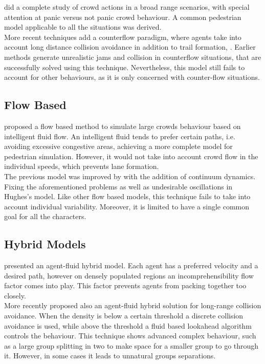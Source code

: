 \documentclass[6pt]{article} %
\begin{document}
\begin{multicols}{2}
\cite{helbing2002} did a complete study of crowd actions in a broad range scenarios, with special attention at panic versus not panic crowd behaviour.
A common pedestrian model applicable to all the situations was derived.\\

More recent techniques add a counterflow paradigm, where agents take into account long distance collision avoidance in addition to trail formation, \cite{heliovaara2012}.
Earlier methods generate unrealistic jams and collision in counterflow situations, that are successfully solved using this technique.
Nevertheless, this model still fails to account for other behaviours, as it is only concerned with counter-flow situations.

\subsection{Flow Based}

\cite{hughes2003} proposed a flow based method to simulate large crowds behaviour based on intelligent fluid flow.
An intelligent fluid tends to prefer certain paths, i.e. avoiding excessive congestive areas, achieving a more complete model for pedestrian simulation.
However, it would not take into account crowd flow in the individual speeds, which prevents lane formation.\\

The previous model was improved by \cite{treuille2006} with the addition of continuum dynamics.
Fixing the aforementioned problems as well as undesirable oscillations in Hughes's model.
Like other flow based models, this technique fails to take into account individual variability.
Moreover, it is limited to have a single common goal for all the characters.

\subsection{Hybrid Models}

\cite{Narain2009} presented an agent-fluid hybrid model.
Each agent has a preferred velocity and a desired path, however on densely populated regions an incomprehensibility flow factor comes into play.
This factor prevents agents from packing together too closely.\\

More recently \cite{lin2014} proposed also an agent-fluid hybrid solution for long-range collision avoidance.
When the density is below a certain threshold a discrete collision avoidance is used,
while above the threshold a fluid based lookahead algorithm controls the behaviour.
This technique shows advanced complex behaviour, such as a large group splitting in two to make space for a smaller group to go through it.
However, in some cases it leads to unnatural groups separations.


\end{multicols}
\end{document}
